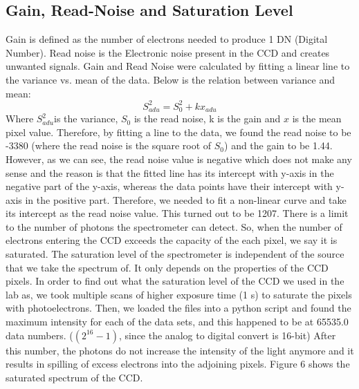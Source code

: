 \documentclass[letterpaper,12pt]{article}
\begin{document}
\subsection{Gain, Read-Noise and Saturation Level}
Gain is defined as the number of electrons needed to produce 1 DN (Digital Number).  Read noise is the Electronic noise present in the CCD and creates unwanted signals. Gain and Read Noise were calculated by fitting a linear line to the variance vs. mean of the data. Below is the relation between variance and mean:
\begin{equation}
S_{adu}^{2}=S_{0}^{2}+kx_{adu}
\end{equation}
Where \begin{math} S_{adu}^2  \end{math}is the variance, \begin{math} S_{0} \end{math} is the read noise, k is the gain and \begin{math}x \end{math} is the mean pixel value. Therefore, by fitting a line to the data, we found the read noise to be -3380 (where the read noise is the square root of \begin{math} S_{0} \end{math}) and the gain to be 1.44. However, as we can see, the read noise value is negative which does not make any sense and the reason is that the fitted line has its intercept with y-axis in the negative part of the y-axis, whereas the data points have their intercept with y-axis in the positive part. Therefore, we needed to fit a non-linear curve and take its intercept as the read noise value. This turned out to be 1207.
There is a limit to the number of photons the spectrometer can detect. So, when the number of electrons entering the CCD exceeds the capacity of the each pixel, we say it is saturated. The saturation level of the spectrometer is independent of the source that we take the spectrum of. It only depends on the properties of the CCD pixels. In order to find out what the saturation level of the CCD we used in the lab as, we took multiple scans of higher exposure time (1 s) to saturate the pixels with photoelectrons. Then, we loaded the files into a python script and found the maximum intensity for each of the data sets, and this happened to be at 65535.0 data numbers. (\begin{math} (2^{16}-1 )\end{math}, since the analog to digital convert is 16-bit)
After this number, the photons do not increase the intensity of the light anymore and it results in spilling of excess electrons into the adjoining pixels. Figure 6 shows the saturated spectrum of the CCD.
\end{document}
